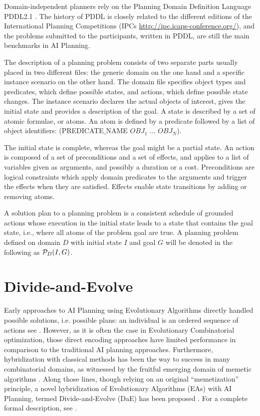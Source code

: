 \documentclass[runningheads,a4paper]{llncs}
\begin{document}
Domain-independent planners rely on the Planning Domain Definition Language PDDL2.1 \cite{Fox-JAIR-2003}. The history of PDDL is closely related to the different editions of the International Planning Competitions (IPCs \url{http://ipc.icaps-conference.org/}), and the problems submitted to the participants, written in PDDL, are still the main benchmarks in AI Planning.

The description of a planning problem consists of two separate parts usually placed in two different files: the generic domain on the one hand and a specific instance scenario on the other hand. The domain file specifies object types and predicates, which define possible states, and actions, which define possible state changes. The instance scenario declares the actual objects of interest, gives the initial state and provides a description of the goal. A state is described by a set of atomic formulae, or atoms. An atom is defined by a predicate followed by a list of object identifiers: (PREDICATE$\_$NAME $OBJ_1$ ... $OBJ_N$). 

The initial state is complete, whereas the goal might be a partial state. An action is composed of a set of preconditions and a set of effects, and applies to a list of variables given as arguments, and possibly a duration or a cost. Preconditions are logical constraints which apply domain predicates to the arguments and trigger the effects when they are satisfied. Effects enable state transitions by adding or removing atoms.

A solution plan to a planning problem is a consistent schedule of grounded actions whose execution in the initial state leads to a state that contains the goal state, i.e., where all atoms of the problem goal are true. A planning problem defined on domain $D$ with initial state $I$ and goal $G$ will be denoted in the following as ${\cal P}_D(I,G)$.

\section{Divide-and-Evolve}

\label{section:dae}

Early approaches to AI Planning using Evolutionary Algorithms directly handled possible solutions, i.e. possible plans: an individual is an ordered sequence of actions see \cite{Spector-AAAI-94,muslea97,westerberg:2000,westerberg:2001,Morignot-2005}. However, as it is often the case in Evolutionary Combinatorial optimization, those direct encoding approaches have limited performance in comparison to the traditional AI planning approaches. Furthermore, hybridization with classical methods has been the way to success in many combinatorial domains, as witnessed by the fruitful emerging domain of memetic algorithms \cite{MemeticBook:2005}. Along those lines, though relying on an original ``memetization'' principle, a novel hybridization of Evolutionary Algorithms (EAs) with AI Planning, termed Divide-and-Evolve (DaE) has been proposed \cite{DAE:EvoCOP06,DAE:book-2007}. For a complete formal description, see \cite{Bibai:ICAPS2010}.
\end{document}
